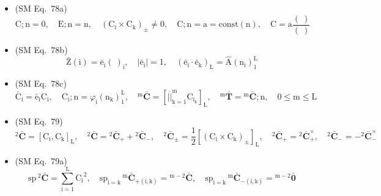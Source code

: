 \documentclass[
    12pt,              %
    a4paper,           %
    headings=normal,   %
    twoside=true,      %
    BCOR=8mm,          %
]{scrbook}
\begin{document}
\begin{itemize}[label={},leftmargin=0pt]
    \item (SM Eq.\ 78a) 
    \[
    \mathrm{C};\mathrm{n} = 0, \quad \mathrm{E};\mathrm{n} = \mathrm{n}, \quad (\mathrm{C_i} \times \mathrm{C_k})_\pm \ne 0, \quad \mathrm{C};\mathrm{n} = \mathrm{a} = \mathrm{const}(\mathrm{n}), \quad \mathrm{C} = \mathrm{a} \frac{(\ )}{(\ )}
    \]

    \item (SM Eq.\ 78b) 
    \[
    \bar{\mathrm{Z}}(\mathrm{i}) = \bar{\mathrm{e}}_\mathrm{i} (\ )_\mathrm{i}, \quad |\bar{\mathrm{e}}_\mathrm{i}| = 1, \quad (\bar{\mathrm{e}}_\mathrm{i} \cdot \bar{\mathrm{e}}_\mathrm{k})_\mathrm{L} = \hat{\mathrm{A}}(\mathrm{n_i})_1^\mathrm{L}
    \]

    \item (SM Eq.\ 78c) 
    \[
    \bar{\mathrm{C}}_\mathrm{i} = \bar{\mathrm{e}}_\mathrm{i} \mathrm{C_i}, \quad \mathrm{C_i};\mathrm{n} = \varphi_\mathrm{i}(\mathrm{n_k})_1^\mathrm{L}, \quad {}^\mathrm{m}\bar{\mathbf{C}} = \left[ \overline{||}_{\mathrm{k}=1}^\mathrm{m} \mathrm{C}_{\mathrm{i_k}} \right]_\mathrm{L}, \quad {}^\mathrm{m}\bar{\mathbf{T}} = {}^\mathrm{m}\bar{\mathbf{C}};\mathrm{n}, \quad 0 \le \mathrm{m} \le \mathrm{L}
    \]

    \item (SM Eq.\ 79) 
    \[
    {}^2\bar{\mathbf{C}} = [\mathrm{C_i}, \mathrm{C_k}]_\mathrm{L}, \quad {}^2\bar{\mathbf{C}} = {}^2\bar{\mathbf{C}}_+ + {}^2\bar{\mathbf{C}}_-, \quad {}^2\bar{\mathbf{C}}_\pm = \frac{1}{2}\left[ (\mathrm{C_i} \times \mathrm{C_k})_\pm \right]_\mathrm{L}, \quad {}^2\bar{\mathbf{C}}_+ = {}^2\bar{\mathbf{C}}_+^\times, \quad {}^2\bar{\mathbf{C}}_- = -{}^2\bar{\mathbf{C}}_-^\times
    \]

    \item (SM Eq.\ 79a) 
    \[
    \mathrm{sp}\,{}^2\bar{\mathbf{C}} = \sum_{\mathrm{i}=1}^\mathrm{L} \mathrm{C_i}^2, \quad \mathrm{sp}_{\mathrm{i=k}}\,{}^\mathrm{m}\bar{\mathbf{C}}_{+(\mathrm{i,k})} = {}^{\mathrm{m}-2}\bar{\mathbf{C}}, \quad \mathrm{sp}_{\mathrm{i=k}}\,{}^\mathrm{m}\bar{\mathbf{C}}_{-(\mathrm{i,k})} = {}^{\mathrm{m}-2}\bar{\mathbf{0}}
    \]


\end{itemize}
\end{document}
